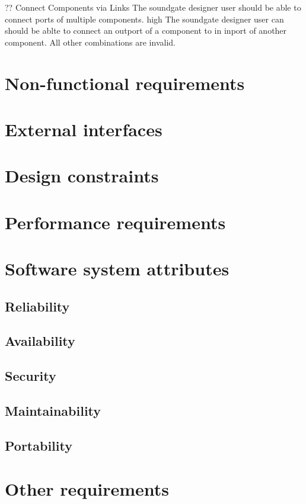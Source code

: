 	{??}
	{Connect Components via Links}
	{The soundgate designer user should be able to connect ports of multiple components.}
	{high}
	{The soundgate designer user can should be ablte to connect an outport of a component to in inport of another component. All other combinations are invalid.}
	
	\section{Non-functional requirements}
	\section{External interfaces}
	\section{Design constraints}
	\section{Performance requirements}
	\section{Software system attributes}
		\subsection{Reliability}
		\subsection{Availability}
		\subsection{Security}
		\subsection{Maintainability}
		\subsection{Portability}
	\section{Other requirements}